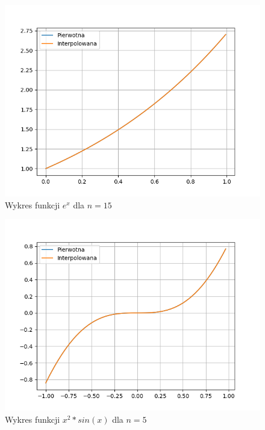 \documentclass[a4paper,14pt]{report}
\begin{document}
    \begin{figure}[H]
      \includegraphics[scale=0.75]{a-15}
      \centering
      \caption{Wykres funkcji $e^{x}$ dla $n=15$}
    \end{figure}
    \begin{figure}[H]
      \includegraphics[scale=0.75]{b-5}
      \centering
      \caption{Wykres funkcji $x^{2}*sin(x)$ dla $n=5$}
    \end{figure}
\end{document}
